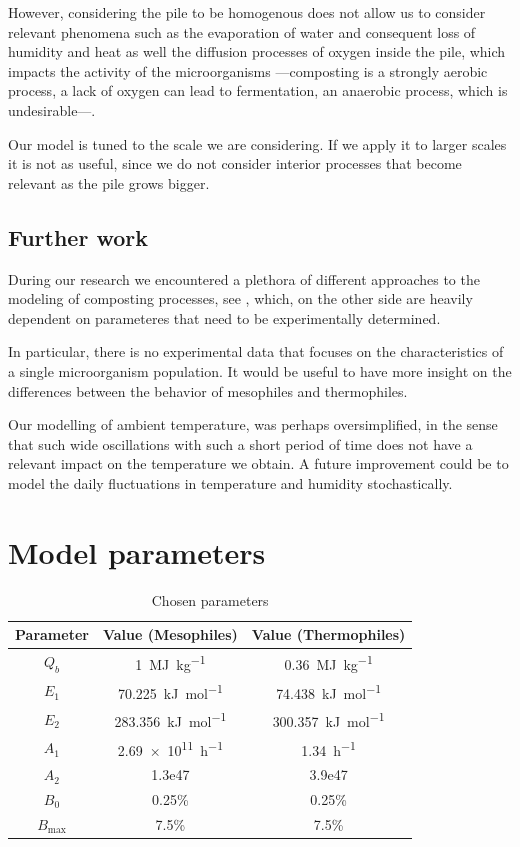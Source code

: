 \documentclass[12pt, a4paper, twocolumn, twoside]{article}
\numberwithin{table}{section}
\numberwithin{figure}{section}
\numberwithin{equation}{section}
\begin{document}
However, considering the pile to be homogenous does not allow us to consider relevant phenomena such as the evaporation of water and consequent loss of humidity and heat as well the diffusion processes of oxygen inside the pile, which impacts the activity of the microorganisms ---composting is a strongly aerobic process, a lack of oxygen can lead to fermentation, an anaerobic process, which is undesirable---.  

Our model is tuned to the scale we are considering. If we apply it to larger scales it is not as useful, since we do not consider interior processes that become relevant as the pile grows bigger. 

\subsection{Further work}
During our research we encountered a plethora of different approaches to the modeling of composting processes, see \cite{mason}, which, on the other side are heavily dependent on parameteres that need to be experimentally determined. 

In particular, there is no experimental data that focuses on the characteristics of a single microorganism population. It would be useful to have more insight on the differences between the behavior of mesophiles and thermophiles. 

Our modelling of ambient temperature, was perhaps oversimplified, in the sense that such wide oscillations with such a short period of time does not have a relevant impact on the temperature we obtain. A future improvement could be to model the daily fluctuations in temperature and humidity stochastically. 

\clearpage
\appendix
\onecolumn

\section{Model parameters}
\begin{table}[htb]
\sffamily \footnotesize \centering
\caption{Chosen parameters}
\label{tab:parametres}
\begin{tabular}{cSS}
		\toprule 
		{Parameter} & {Value (Mesophiles)} & {Value (Thermophiles)} \\
		\midrule 
		$Q_b$ & \SI{1}{MJ.kg^{-1}} & \SI{0.36}{MJ.kg^{-1}} \\
		$E_1$ & \SI{70.225}{kJ.mol^{-1}} & \SI{74.438}{kJ.mol^{-1}} \\
		$E_2$ & \SI{283.356}{kJ.mol^{-1}} & \SI{300.357}{kJ.mol^{-1}} \\
		$A_1$ & \SI{2.69e11}{h^{-1}} & \SI{1.34}{h^{-1}} \\
		$A_2$ & 1.3e47 & 3.9e47 \\
		$B_0$ & 0.25\% & 0.25\% \\ 
		$B_\text{max}$ & 7.5\% & 7.5\% \\
		\bottomrule
	\end{tabular}
\end{table}
\end{document}
